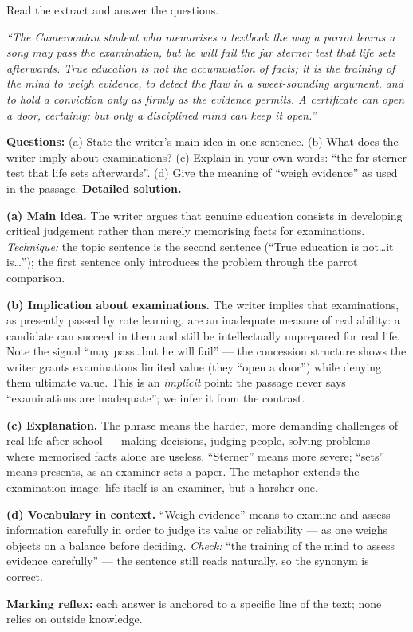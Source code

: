 \documentclass[11pt]{article}
\begin{document}
\begin{exoresolu}
Read the extract and answer the questions.

\emph{``The Cameroonian student who memorises a textbook the way a parrot learns a song may pass the examination, but he will fail the far sterner test that life sets afterwards. True education is not the accumulation of facts; it is the training of the mind to weigh evidence, to detect the flaw in a sweet-sounding argument, and to hold a conviction only as firmly as the evidence permits. A certificate can open a door, certainly; but only a disciplined mind can keep it open.''}

\textbf{Questions:} (a) State the writer's main idea in one sentence. (b) What does the writer imply about examinations? (c) Explain in your own words: ``the far sterner test that life sets afterwards''. (d) Give the meaning of ``weigh evidence'' as used in the passage.
\tcblower
\textbf{Detailed solution.}

\textbf{(a) Main idea.} The writer argues that genuine education consists in developing critical judgement rather than merely memorising facts for examinations. \emph{Technique:} the topic sentence is the second sentence (``True education is not\ldots it is\ldots''); the first sentence only introduces the problem through the parrot comparison.

\textbf{(b) Implication about examinations.} The writer implies that examinations, as presently passed by rote learning, are an inadequate measure of real ability: a candidate can succeed in them and still be intellectually unprepared for real life. Note the signal ``may pass\ldots but he will fail'' — the concession structure shows the writer grants examinations limited value (they ``open a door'') while denying them ultimate value. This is an \emph{implicit} point: the passage never says ``examinations are inadequate''; we infer it from the contrast.

\textbf{(c) Explanation.} The phrase means the harder, more demanding challenges of real life after school — making decisions, judging people, solving problems — where memorised facts alone are useless. ``Sterner'' means more severe; ``sets'' means presents, as an examiner sets a paper. The metaphor extends the examination image: life itself is an examiner, but a harsher one.

\textbf{(d) Vocabulary in context.} ``Weigh evidence'' means to examine and assess information carefully in order to judge its value or reliability — as one weighs objects on a balance before deciding. \emph{Check:} ``the training of the mind to assess evidence carefully'' — the sentence still reads naturally, so the synonym is correct.

\textbf{Marking reflex:} each answer is anchored to a specific line of the text; none relies on outside knowledge.
\end{exoresolu}
\end{document}

